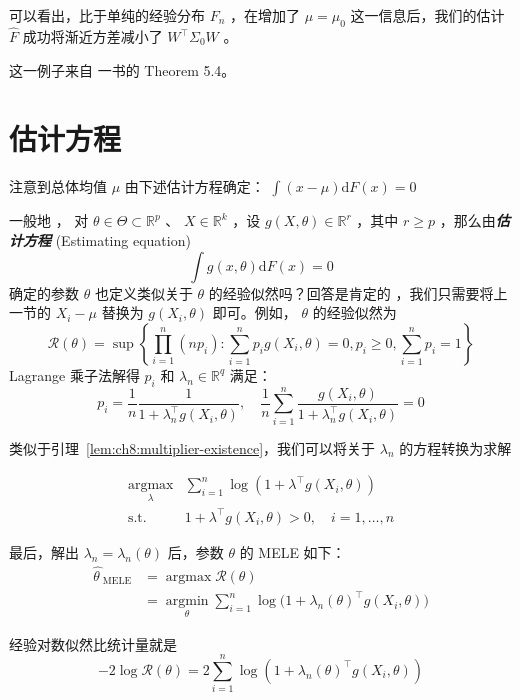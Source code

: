 可以看出，比于单纯的经验分布 $F_n$ ，在增加了 $\mu=\mu_0$ 这一信息后，我们的估计 $\widehat F$ 成功将渐近方差减小了 $W^\top\Sigma_0 W$ 。

这一例子来自 \cite{shao2003} 一书的 Theorem 5.4。

\section{估计方程}

注意到总体均值 $\mu$ 由下述估计方程确定： $\int(x-\mu)\mathrm dF(x)=0$

一般地 ， 对 $\theta\in\Theta\subset \mathbb R^p$ 、 $X\in\mathbb R^k$ ，设 $g(X,\theta)\in\mathbb R^{r}$ ，其中 $r\ge p$ ，那么由\textbf{\emph{估计方程}} (Estimating equation) 
$$\int g(x,\theta)\mathrm dF(x)=0$$
确定的参数 $\theta$ 也定义类似关于 $\theta$ 的经验似然吗？回答是肯定的 ，我们只需要将上一节的 $X_i-\mu$ 替换为 $g(X_i,\theta)$ 即可。例如， $\theta$ 的经验似然为
$$\mathcal R(\theta)=\sup\left\{\prod_{i=1}^n(np_i):\sum_{i=1}^np_i g(X_i,\theta)=0,p_i\ge 0,\sum_{i=1}^np_i=1\right\}$$
Lagrange 乘子法解得 $p_i$ 和 $\lambda_n\in\mathbb R^q$ 满足：
\begin{equation}
\label{eq:ch8:tag-7}
p_i = \frac{1}{n}\frac{1}{1 + \lambda_n^\top g(X_i,\theta)},\quad \frac{1}{n}\sum_{i=1}^n \frac{g(X_i,\theta)}{1 + \lambda_n^\top g(X_i,\theta)} = 0
\end{equation}

类似于引理~\ref{lem:ch8:multiplier-existence}，我们可以将关于 $\lambda_n$ 的方程转换为求解

\begin{equation}
\label{eq:ch8:tag-8}
\begin{aligned} \operatorname*{\arg\max}_{\lambda}&\sum_{i=1}^n\log(1+\lambda^\top g(X_i,\theta))\\ \text{s.t. }& 1+\lambda^\top g(X_i,\theta)>0,\quad i=1,\dots,n \end{aligned}
\end{equation}

最后，解出 $\lambda_n=\lambda_n(\theta)$ 后，参数 $\theta$ 的 MELE 如下：
\[\begin{aligned} \widehat{\theta\ }_{\text{MELE}}&=\operatorname*{\arg\max}\mathcal R(\theta)\\ &=\operatorname*{\arg\min}_\theta\sum_{i=1}^n\log\big(1+\lambda_n(\theta)^\top g(X_i,\theta)\big) \end{aligned}\]

经验对数似然比统计量就是 
$$-2\log\mathcal R(\theta)=2\sum_{i=1}^n\log(1+\lambda_n(\theta)^\top g(X_i,\theta))$$

